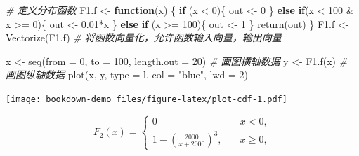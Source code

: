 \documentclass[
]{book}
\newenvironment{Shaded}{\begin{snugshade}}{\end{snugshade}}
\newcommand{\AttributeTok}[1]{\textcolor[rgb]{0.77,0.63,0.00}{#1}}
\newcommand{\CommentTok}[1]{\textcolor[rgb]{0.56,0.35,0.01}{\textit{#1}}}
\newcommand{\ControlFlowTok}[1]{\textcolor[rgb]{0.13,0.29,0.53}{\textbf{#1}}}
\newcommand{\DecValTok}[1]{\textcolor[rgb]{0.00,0.00,0.81}{#1}}
\newcommand{\FloatTok}[1]{\textcolor[rgb]{0.00,0.00,0.81}{#1}}
\newcommand{\FunctionTok}[1]{\textcolor[rgb]{0.00,0.00,0.00}{#1}}
\newcommand{\NormalTok}[1]{#1}
\newcommand{\OtherTok}[1]{\textcolor[rgb]{0.56,0.35,0.01}{#1}}
\newcommand{\SpecialCharTok}[1]{\textcolor[rgb]{0.00,0.00,0.00}{#1}}
\newcommand{\StringTok}[1]{\textcolor[rgb]{0.31,0.60,0.02}{#1}}
\begin{document}
\begin{Shaded}
\begin{Highlighting}[]
\CommentTok{\# 定义分布函数}
\NormalTok{F1.f }\OtherTok{\textless{}{-}} \ControlFlowTok{function}\NormalTok{(x) \{}
  \ControlFlowTok{if}\NormalTok{ (x }\SpecialCharTok{\textless{}} \DecValTok{0}\NormalTok{)\{}
\NormalTok{    out }\OtherTok{\textless{}{-}} \DecValTok{0}
\NormalTok{  \} }\ControlFlowTok{else} \ControlFlowTok{if}\NormalTok{(x }\SpecialCharTok{\textless{}} \DecValTok{100} \SpecialCharTok{\&}\NormalTok{ x }\SpecialCharTok{\textgreater{}=} \DecValTok{0}\NormalTok{)\{}
\NormalTok{    out }\OtherTok{\textless{}{-}} \FloatTok{0.01}\SpecialCharTok{*}\NormalTok{x}
\NormalTok{  \} }\ControlFlowTok{else} \ControlFlowTok{if}\NormalTok{ (x }\SpecialCharTok{\textgreater{}=} \DecValTok{100}\NormalTok{)\{}
\NormalTok{    out }\OtherTok{\textless{}{-}} \DecValTok{1}
\NormalTok{  \}}
  \FunctionTok{return}\NormalTok{(out)}
\NormalTok{\}}
\NormalTok{F1.f }\OtherTok{\textless{}{-}}  \FunctionTok{Vectorize}\NormalTok{(F1.f) }\CommentTok{\# 将函数向量化，允许函数输入向量，输出向量}

\NormalTok{x }\OtherTok{\textless{}{-}} \FunctionTok{seq}\NormalTok{(}\AttributeTok{from =} \DecValTok{0}\NormalTok{, }\AttributeTok{to =} \DecValTok{100}\NormalTok{, }\AttributeTok{length.out =} \DecValTok{20}\NormalTok{) }\CommentTok{\# 画图横轴数据}
\NormalTok{y }\OtherTok{\textless{}{-}} \FunctionTok{F1.f}\NormalTok{(x)  }\CommentTok{\# 画图纵轴数据}
\FunctionTok{plot}\NormalTok{(x, y, }\AttributeTok{type =} \StringTok{\textquotesingle{}l\textquotesingle{}}\NormalTok{, }\AttributeTok{col =} \StringTok{"blue"}\NormalTok{, }\AttributeTok{lwd =} \DecValTok{2}\NormalTok{)}
\end{Highlighting}
\end{Shaded}

\texttt{[image: bookdown-demo\_files/figure-latex/plot-cdf-1.pdf]}

\[
\begin{equation}
F_2(x) = \begin{cases}
0 &\quad x <0,\\
1 - \left(\frac{2000}{x + 2000}\right)^3, & \quad x\ge 0,
\end{cases}
\end{equation}
\]
\end{document}
